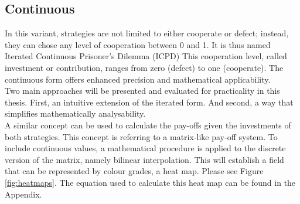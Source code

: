 \documentclass{article}
\begin{document}
\subsection{Continuous}

In this variant, strategies are not limited to either cooperate or defect; instead, they can chose any level of cooperation between 0 and 1.
It is thus named Iterated Continuous Prisoner's Dilemma (ICPD)
This cooperation level, called investment or contribution, ranges from zero (defect) to one (cooperate).
The continuous form offers enhanced precision and mathematical applicability.\\
%

Two main approaches will be presented and evaluated for practicality in this thesis.
First, an intuitive extension of the iterated form. And second, a way that simplifies mathematically analysability.\\
A similar concept can be used to calculate the pay-offs given the investments of both strategies.
This concept is referring to a matrix-like pay-off system.
To include continuous values, a mathematical procedure is applied to the discrete version of the matrix, namely bilinear interpolation.
This will establish a field that can be represented by colour grades, a heat map.
Please see Figure \ref{fig:heatmaps}.
The equation used to calculate this heat map can be found in the Appendix.
\end{document}
